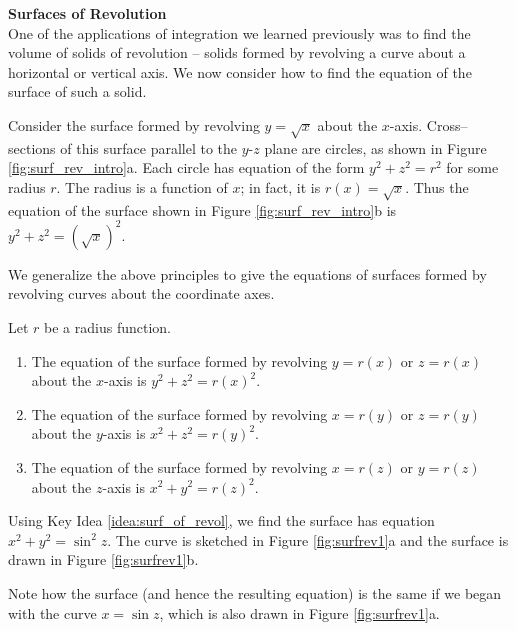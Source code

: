 \clearpage

\noindent\textbf{\large Surfaces of Revolution}\\

One of the applications of integration we learned previously was to find the volume of solids of revolution -- solids formed by revolving a curve about a horizontal or vertical axis. We now consider how to find the equation of the surface of such a solid.

Consider the surface formed by revolving $y=\sqrt{x}$ about the $x$-axis. Cross--sections of this surface parallel to the $y$-$z$ plane are circles, as shown in Figure \ref{fig:surf_rev_intro}a. Each circle has equation of the form $y^2+z^2=r^2$ for some radius $r$. The radius is a function of $x$; in fact, it is $r(x) = \sqrt{x}$. Thus the equation of the surface shown in Figure \ref{fig:surf_rev_intro}b is $y^2+z^2=(\sqrt{x})^2.$


We generalize the above principles to give the equations of surfaces formed by revolving curves about the coordinate axes.

{Let $r$ be a radius function. 
\begin{enumerate}
	\item The equation of the surface formed by revolving $y=r(x)$ or $z=r(x)$ about the $x$-axis is $y^2+z^2=r(x)^2$.
	\item The equation of the surface formed by revolving $x=r(y)$ or $z=r(y)$ about the $y$-axis is $x^2+z^2=r(y)^2$.
	\item The equation of the surface formed by revolving $x=r(z)$ or $y=r(z)$ about the $z$-axis is $x^2+y^2=r(z)^2$.
\end{enumerate}
}

{Using Key Idea \ref{idea:surf_of_revol}, we find the surface has equation $x^2+y^2=\sin^2z$. The curve is sketched in Figure \ref{fig:surfrev1}a and the surface is drawn in Figure \ref{fig:surfrev1}b.

Note how the surface (and hence the resulting equation) is the same if we began with the curve $x=\sin z$, which is also drawn in Figure \ref{fig:surfrev1}a.
}\\

